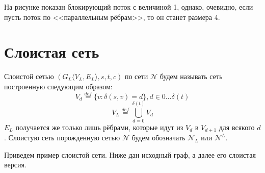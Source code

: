 \begin{figure}[h]
    \centering
\end{figure}

На рисунке показан блокирующий поток с величиной 1, однако, очевидно, если пусть поток по <<параллельным рёбрам>>, то он станет размера 4.

\section{Слоистая сеть}

\Def Слоистой сетью $(G_L\langle V_L, E_L \rangle, s, t, c)$ по сети $\mathcal{N}$ будем называть сеть построенную следующим образом:
\begin{equation*}
    V_d \overset{def}{=} \{ v: \delta(s, v) = d \}, d \in 0 \dots \delta(t)
\end{equation*}
\begin{equation*}
    V_L \overset{def}{=} \bigcup\limits_{d = 0}^{\delta(t)} V_d
\end{equation*}
$E_L$ получается же только лишь рёбрами, которые идут из $V_{d}$ в $V_{d + 1}$ для всякого $d$. Слоистую сеть порожденную сетью $\mathcal{N}$ будем обозначать $\mathcal{N}_L$ или $\mathcal{N}^L$.

Приведем пример слоистой сети. Ниже дан исходный граф, а далее его слоистая версия.

